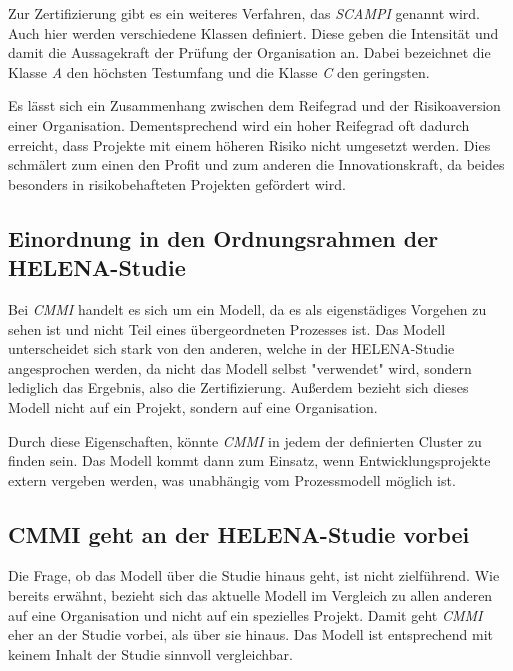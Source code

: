 Zur Zertifizierung gibt es ein weiteres Verfahren, das \textit{SCAMPI} genannt wird. Auch hier werden verschiedene Klassen definiert. Diese geben die Intensität und damit die Aussagekraft der Prüfung der Organisation an. Dabei bezeichnet die Klasse \textit{A} den höchsten Testumfang und die Klasse \textit{C} den geringsten.

Es lässt sich ein Zusammenhang zwischen dem Reifegrad und der Risikoaversion einer Organisation. Dementsprechend wird ein hoher Reifegrad oft dadurch erreicht, dass Projekte mit einem höheren Risiko nicht umgesetzt werden. Dies schmälert zum einen den Profit und zum anderen die Innovationskraft, da beides besonders in risikobehafteten Projekten gefördert wird.

\subsection{Einordnung in den Ordnungsrahmen der HELENA-Studie}
Bei \textit{CMMI} handelt es sich um ein Modell, da es als eigenstädiges Vorgehen zu sehen ist und nicht Teil eines übergeordneten Prozesses ist. Das Modell unterscheidet sich stark von den anderen, welche in der HELENA-Studie angesprochen werden, da nicht das Modell selbst "verwendet" wird, sondern lediglich das Ergebnis, also die Zertifizierung. Außerdem bezieht sich dieses Modell nicht auf ein Projekt, sondern auf eine Organisation.

Durch diese Eigenschaften, könnte \textit{CMMI} in jedem der definierten Cluster zu finden sein. Das Modell kommt dann zum Einsatz, wenn Entwicklungsprojekte extern vergeben werden, was unabhängig vom Prozessmodell möglich ist.

\subsection{CMMI geht an der HELENA-Studie vorbei}
Die Frage, ob das Modell über die Studie hinaus geht, ist nicht zielführend. Wie bereits erwähnt, bezieht sich das aktuelle Modell im Vergleich zu allen anderen auf eine Organisation und nicht auf ein spezielles Projekt. Damit geht \textit{CMMI} eher an der Studie vorbei, als über sie hinaus. Das Modell ist entsprechend mit keinem Inhalt der Studie sinnvoll vergleichbar.